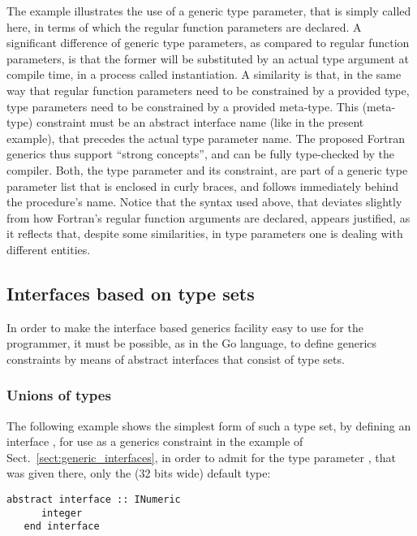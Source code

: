 \documentclass[11pt,oneside]{report}
\newcommand{\code}[1]{{\selectfont\ttfamily{#1}}}
\begin{document}
The example illustrates the use of a generic type parameter, that is
simply called \code{T} here, in terms of which the regular function
parameters are declared. A significant difference of generic type
parameters, as compared to regular function parameters, is that the
former will be substituted by an actual type argument at compile time,
in a process called instantiation. A similarity is that, in the same
way that regular function parameters need to be constrained by a
provided type, type parameters need to be constrained by a provided
meta-type. This (meta-type) constraint must be an abstract interface
name (like \code{INumeric} in the present example), that precedes the
actual type parameter name. The proposed Fortran generics thus support
``strong concepts'', and can be fully type-checked by the
compiler. Both, the type parameter and its constraint, are part of a
generic type parameter list that is enclosed in curly braces, and
follows immediately behind the procedure's name. Notice that the
syntax used above, that deviates slightly from how Fortran's regular
function arguments are declared, appears justified, as it reflects
that, despite some similarities, in type parameters one is dealing
with different entities.

\subsection{Interfaces based on type sets}
\label{sect:type_sets}

In order to make the interface based generics facility easy to use for
the programmer, it must be possible, as in the Go language, to define
generics constraints by means of abstract interfaces that consist of
type sets.

\subsubsection{Unions of types}

The following example shows the simplest form of such a type set, by
defining an interface \code{INumeric}, for use as a generics
constraint in the example of Sect.~\ref{sect:generic_interfaces}, in
order to admit for the type parameter \code{T}, that was given there,
only the (32 bits wide) default \code{integer} type:
\begin{lstlisting}[language=LFortran,style=boxed]
   abstract interface :: INumeric
      integer
   end interface
\end{lstlisting}
\end{document}
